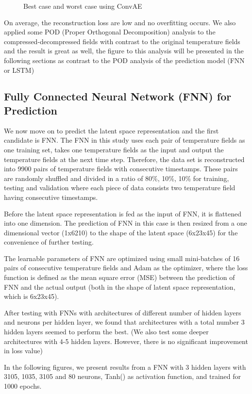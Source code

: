 \begin{figure}[H]
\caption{Best case and worst case using ConvAE}
\label{fig:figures}
\end{figure}


On average, the reconstruction loss are low and no overfitting occurs. We also applied some POD (Proper Orthogonal Decomposition) analysis to the compressed-decompressed fields with contrast to the original temperature fields and the result is great as well, the figure to this analysis will be presented in the following sections as contrast to the POD analysis of the prediction model (FNN or LSTM) 


\subsection{Fully Connected Neural Network (FNN) for Prediction}

We now move on to predict the latent space representation and the first candidate is FNN. The FNN in this study uses each pair of temperature fields as one training set, takes one temperature fields as the input and output the temperature fields at the next time step. Therefore, the data set is reconstructed into 9900 pairs of temperature fields with consecutive timestamps. These pairs are randomly shuffled and divided in a ratio of 80\%, 10\%, 10\% for training, testing and validation where each piece of data consists two temperature field having consecutive timestamps.

Before the latent space representation is fed as the input of FNN, it is flattened into one dimension. The prediction of FNN in this case is then resized from a one dimensional vector (1x6210) to the shape of the latent space (6x23x45) for the convenience of further testing.

The learnable parameters of FNN are optimized using small mini-batches of 16 pairs of consecutive temperature fields and Adam as the optimizer, where the loss function is defined as the mean square error (MSE) between the prediction of FNN and the actual output (both in the shape of latent space representation, which is 6x23x45).

After testing with FNNs with architectures of different number of hidden layers and neurons per hidden layer, we found that architectures with a total number 3 hidden layers seemed to perform the best. (We also test some deeper architectures with 4-5 hidden layers. However, there is no significant improvement in loss value)

In the following figures, we present results from a FNN with 3 hidden layers with 3105, 1035, 3105 and 80 neurons, Tanh() as activation function, and trained for 1000 epochs.

